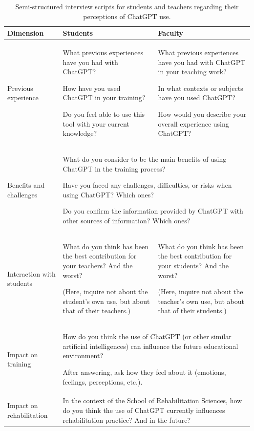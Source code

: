 \documentclass[english]{textolivre}
\begin{document}
\begin{table}[h]
\centering
\small
\caption{Semi-structured interview scripts for students and teachers regarding their perceptions of ChatGPT use.}
\label{tab:appendixA}
\small
\begin{tabularx}{\textwidth}{p{2.5cm} X X}
\toprule
Dimension & Students & Faculty \\
\midrule

Previous experience
&
What previous experiences have you had with ChatGPT?

How have you used ChatGPT in your training?

Do you feel able to use this tool with your current knowledge?
&
What previous experiences have you had with ChatGPT in your teaching work?

In what contexts or subjects have you used ChatGPT?

How would you describe your overall experience using ChatGPT?
\\
\hline

Benefits and challenges
&
\multicolumn{2}{p{0.75\textwidth}}{
What do you consider to be the main benefits of using ChatGPT in the training process?

Have you faced any challenges, difficulties, or risks when using ChatGPT? Which ones?

Do you confirm the information provided by ChatGPT with other sources of information? Which ones?
}
\\
\hline

Interaction with students
&
What do you think has been the best contribution for your teachers? And the worst?

(Here, inquire not about the student's own use, but about that of their teachers.)
&
What do you think has been the best contribution for your students? And the worst?

(Here, inquire not about the teacher's own use, but about that of their students.)
\\
\hline

Impact on training
&
\multicolumn{2}{p{0.75\textwidth}}{
How do you think the use of ChatGPT (or other similar artificial intelligences) can influence the future educational environment?

After answering, ask how they feel about it (emotions, feelings, perceptions, etc.).
}
\\
\hline

Impact on rehabilitation
&
\multicolumn{2}{p{0.75\textwidth}}{
In the context of the School of Rehabilitation Sciences, how do you think the use of ChatGPT currently influences rehabilitation practice? And in the future?
}
\\
\hline


\end{tabularx}
\end{table}
\end{document}
